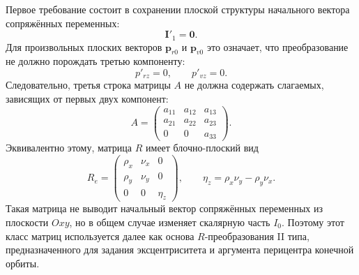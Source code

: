 Первое требование состоит в сохранении плоской структуры начального вектора сопряжённых переменных:
\begin{equation}
\mathbf I'_1=\mathbf 0.
\end{equation}
Для произвольных плоских векторов \(\mathbf p_{r0}\) и \(\mathbf p_{v0}\) это означает, что преобразование не должно порождать третью компоненту:
\begin{equation}
p'_{rz}=0,\qquad p'_{vz}=0.
\end{equation}
Следовательно, третья строка матрицы \(A\) не должна содержать слагаемых, зависящих от первых двух компонент:
\begin{equation}
A=
\begin{pmatrix}
	a_{11} & a_{12} & a_{13}\\
	a_{21} & a_{22} & a_{23}\\
	0      & 0      & a_{33}
\end{pmatrix}.
\end{equation}
Эквивалентно этому, матрица \(R\) имеет блочно-плоский вид
\begin{equation}
R_e=
\begin{pmatrix}
	\rho_x & \nu_x & 0\\
	\rho_y & \nu_y & 0\\
	0      & 0     & \eta_z
\end{pmatrix},
\qquad
\eta_z=\rho_x\nu_y-\rho_y\nu_x .
\end{equation}
Такая матрица не выводит начальный вектор сопряжённых переменных из плоскости \(Oxy\), но в общем случае изменяет скалярную часть \(I_0\). Поэтому этот класс матриц используется далее как основа \(R\)-преобразования II типа, предназначенного для задания эксцентриситета и аргумента перицентра конечной орбиты.

